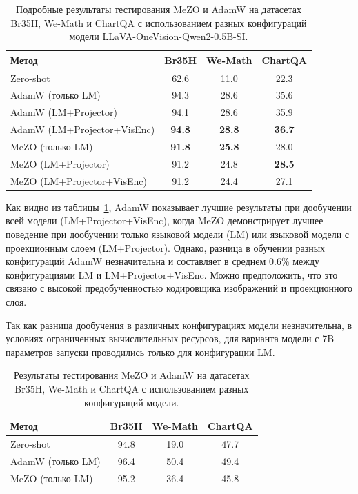 \documentclass[LI,KR]{HSEUniversity}
\begin{document}
\begin{table}[H]
\centering
\begin{tabular}{|l|c|c|c|}
\hline
\textbf{Метод} & \textbf{Br35H} & \textbf{We-Math} & \textbf{ChartQA} \\ \hline
Zero-shot                         & 62.6  & 11.0  & 22.3  \\ \hline
AdamW (только LM)                   & 94.3  & 28.6  & 35.6  \\ \hline
AdamW (LM+Projector)                & 94.1  & 28.6  & 35.9  \\ \hline
AdamW (LM+Projector+VisEnc)         & \textbf{94.8}  & \textbf{28.8}  & \textbf{36.7}  \\ \hline
MeZO (только LM)                   & \textbf{91.8}  & \textbf{25.8}  & 28.0  \\ \hline
MeZO (LM+Projector)                & 91.2  & 24.8  & \textbf{28.5}  \\ \hline
MeZO (LM+Projector+VisEnc)         & 91.2  & 24.4  & 27.1  \\ \hline
\end{tabular}
\caption{Подробные результаты тестирования MeZO и AdamW на датасетах Br35H, We-Math и ChartQA с использованием разных конфигураций модели LLaVA-OneVision-Qwen2-0.5B-SI.}
\label{tab:detailed-results}
\end{table}

Как видно из таблицы~\ref{tab:detailed-results}, AdamW показывает лучшие результаты при дообучении всей модели (LM+Projector+VisEnc),
когда MeZO демонстрирует лучшее поведение при дообучении только языковой модели (LM) или языковой модели с проекционным слоем (LM+Projector).
Однако, разница в обучении разных конфигураций AdamW незначительна и составляет в среднем 0.6\% между конфигурациями LM и LM+Projector+VisEnc.
Можно предположить, что это связано с высокой предобученностью кодировщика изображений и проекционного слоя.

Так как разница дообучения в различных конфигурациях модели незначительна,
в условиях ограниченных вычислительных ресурсов,
для варианта модели с 7B параметров запуски проводились только для конфигурации LM.

\begin{table}[H]
\centering
\begin{tabular}{|l|c|c|c|}
\hline
\textbf{Метод} & \textbf{Br35H} & \textbf{We-Math} & \textbf{ChartQA} \\ \hline
Zero-shot                         & 94.8  & 19.0  & 47.7  \\ \hline
AdamW (только LM)                   & 96.4  & 50.4  & 49.4  \\ \hline
MeZO (только LM)                   & 95.2  & 36.4  & 45.8  \\ \hline
\end{tabular}
\caption{Результаты тестирования MeZO и AdamW на датасетах Br35H, We-Math и ChartQA с использованием разных конфигураций модели.}
\label{tab:detailed-results-7b}
\end{table}
\end{document}

